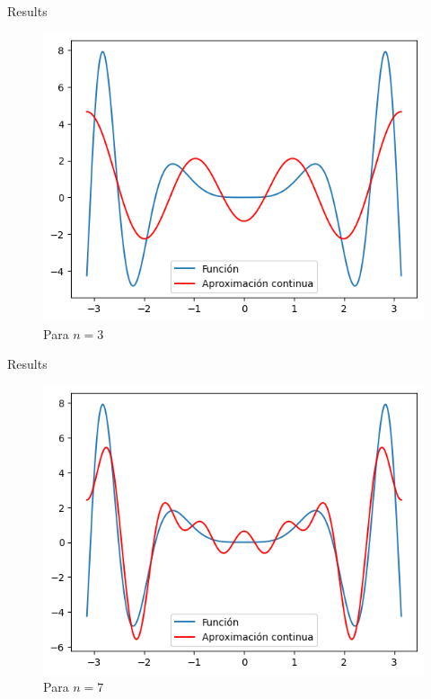 \begin{frame}{Results}
    \begin{figure}
        \centering
        \includegraphics[width=.5\paperwidth]{p13-Aprox-continua.png}
        \caption{Para $n=3$}
        \label{fig:enter-label}
    \end{figure}
\end{frame}
\begin{frame}{Results}
    \begin{figure}
        \centering
        \includegraphics[width=.5\paperwidth]{p13-A-continua.png}
        \caption{Para $n=7$}
        \label{fig:enter-label}
    \end{figure}
\end{frame}
